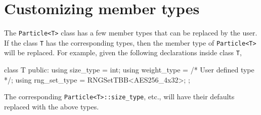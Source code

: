 \section{Customizing member types}
\label{sec:Customizing member types}

The \verb|Particle<T>| class has a few member types that can be replaced by the
user. If the class \verb|T| has the corresponding types, then the member type
of \verb|Particle<T>| will be replaced. For example, given the following
declarations inside class \verb|T|,
\begin{cppcode}
  class T
  {
      public:
      using size_type = int;
      using weight_type = /* User defined type */;
      using rng_set_type = RNGSetTBB<AES256_4x32>;
  };
\end{cppcode}
The corresponding \verb|Particle<T>::size_type|, etc., will have their defaults
replaced with the above types.

